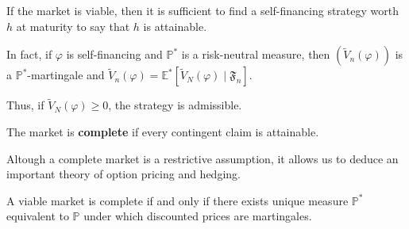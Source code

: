\begin{remark}\label{rmk:1.3.2}
    If the market is viable, then it is sufficient to find a self-financing strategy worth $h$ at maturity to say that $h$ is attainable.

    In fact, if $\varphi$ is self-financing and $\mathbb{P}^\ast$ is a risk-neutral measure, then $(\tilde{V}_n(\varphi))$ is a $\mathbb{P}^\ast$-martingale and $\tilde{V}_n(\varphi) = \mathbb{E}^\ast[\tilde{V}_N(\varphi) \mid \mathfrak{F}_n]$. 

    Thus, if $\tilde{V}_N(\varphi) \geq 0$, the strategy is admissible. 
\end{remark}

\begin{definition}
    The market is \textbf{complete} if every contingent claim is attainable.
\end{definition}

Altough a complete market is a restrictive assumption, it allows us to deduce an important theory of option pricing and hedging. 

\begin{theorem}
    A viable market is complete if and only if there exists unique measure $\mathbb{P}^\ast$ equivalent to $\mathbb{P}$ under which discounted prices are martingales.
\end{theorem}

